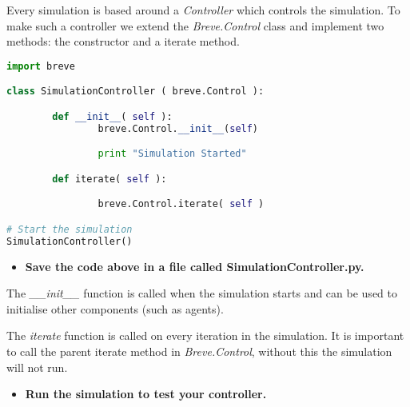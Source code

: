 
Every simulation is based around a \textit{Controller} which controls the simulation. To make such a controller we extend the \textit{Breve.Control} class and implement two methods: the constructor and a iterate method.

\begin{lstlisting}[language=Python]
import breve

class SimulationController ( breve.Control ):

        def __init__( self ):
                breve.Control.__init__(self)

                print "Simulation Started"

        def iterate( self ):

                breve.Control.iterate( self )

# Start the simulation
SimulationController()
\end{lstlisting}



\begin{itemize}[>]
	\item \textbf{Save the code above in a file called \textbf{SimulationController.py}.}
\end{itemize}

The \textit{\_\_init\_\_} function is called when the simulation starts and can be used to initialise other components (such as agents). 

The \textit{iterate} function is called on every iteration in the simulation. It is important to call the parent iterate method in \textit{Breve.Control}, without this the simulation will not run.

\begin{itemize}[>]
	\item \textbf{ Run the simulation to test your controller.}
\end{itemize}